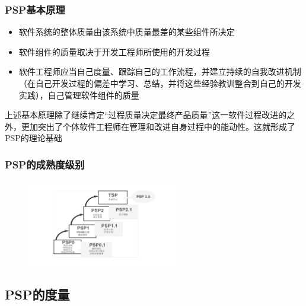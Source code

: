 \subsubsection{PSP基本原理}
\begin{itemize}
    \item 软件系统的整体质量由该系统中质量最差的某些组件所决定
    \item 软件组件的质量取决于开发工程师所使用的开发过程
    \item 软件工程师应当自己度量、跟踪自己的工作流程，并建立持续的自我改进机制（在自己开发过程的偏差中学习、总结，并将这些经验教训整合到自己的开发实践），自己管理软件组件的质量
\end{itemize}
上述基本原理除了继续肯定“过程质量决定最终产品质量”这一软件过程改进的之外，更加突出了个体软件工程师在管理和改进自身过程中的能动性。这就形成了PSP的理论基础

\subsubsection{PSP的成熟度级别}
\begin{figure}[H]
    \vspace{-0.5em}
	\centering
	\includegraphics[width=0.6\textwidth]{images/PSP的不同级别.pdf}
    \vspace{-1em}
\end{figure}

\subsection{PSP的度量}

